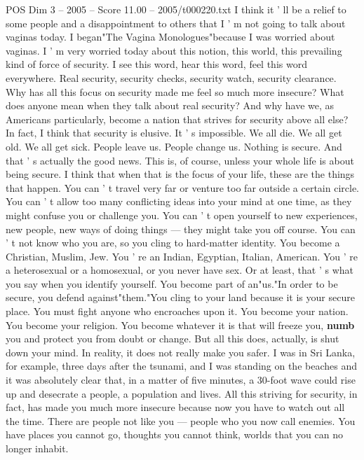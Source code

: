 \begin{textsample}{POS Dim 3 – 2005 – Score 11.00 – 2005/t000220.txt}  \label{ex:f3_pos_048}
I think it ' ll be a relief to some people and a disappointment to others that I ' m not going to talk about vaginas today.
I began"The Vagina Monologues"because I was worried about vaginas.
I ' m very worried today about this notion, this world, this prevailing kind of force of security.
I see this word, hear this word, feel this word everywhere.
Real security, security checks, security watch, security clearance.
Why has all this focus on security made me feel so much more insecure?
What does anyone mean when they talk about real security?
And why have we, as Americans particularly, become a nation that strives for security above all else?
In fact, I think that security is elusive.
It ' s impossible.
We all die.
We all get old.
We all get sick.
People leave us.
People change us.
Nothing is secure.
And that ' s actually the good news.
This is, of course, unless your whole life is about being secure.
I think that when that is the focus of your life, these are the things that happen.
You can ' t travel very far or venture too far outside a certain circle.
You can ' t allow too many conflicting ideas into your mind at one time, as they might confuse you or challenge you.
You can ' t open yourself to new experiences, new people, new ways of doing things — they might take you off course.
You can ' t not know who you are, so you cling to hard-matter identity.
You become a Christian, Muslim, Jew.
You ' re an Indian, Egyptian, Italian, American.
You ' re a heterosexual or a homosexual, or you never have sex.
Or at least, that ' s what you say when you identify yourself.
You become part of an"us."In order to be secure, you defend against"them."You cling to your land because it is your secure place.
You must fight anyone who encroaches upon it.
You become your nation.
You become your religion.
You become whatever it is that will freeze you, \textbf{numb} you and protect you from doubt or change.
But all this does, actually, is shut down your mind.
In reality, it does not really make you safer.
I was in Sri Lanka, for example, three days after the tsunami, and I was standing on the beaches and it was absolutely clear that, in a matter of five minutes, a 30-foot wave could rise up and desecrate a people, a population and lives.
All this striving for security, in fact, has made you much more insecure because now you have to watch out all the time.
There are people not like you — people who you now call enemies.
You have places you cannot go, thoughts you cannot think, worlds that you can no longer inhabit.

\end{textsample}

